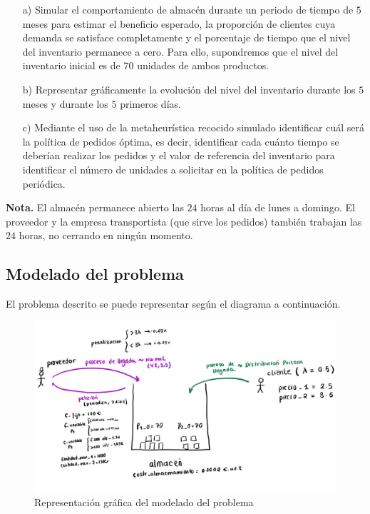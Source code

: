 \documentclass[a4paper,12pt]{article}
\begin{document}
	\begin{enumerate}
		\item[a)] Simular el comportamiento de almacén durante un periodo de tiempo de $5$ meses para estimar el beneficio esperado, la proporción de clientes cuya demanda se satisface completamente y el porcentaje de tiempo que el nivel del inventario permanece a cero. Para ello, supondremos que el nivel del inventario inicial es de $70$ unidades de ambos productos.

		\item[b)] Representar gráficamente la evolución del nivel del inventario durante los $5$ meses y durante los $5$ primeros días. 

		\item[c)] Mediante el uso de la metaheurística recocido simulado identificar cuál será la política de pedidos óptima, es decir, identificar cada cuánto tiempo se deberían realizar los pedidos y el valor de referencia del inventario para identificar el número de unidades a solicitar en la política de pedidos periódica.
	\end{enumerate}
	
	\textbf{Nota.} El almacén permanece abierto las $24$ horas al día de lunes a domingo. El proveedor y la empresa transportista (que sirve los pedidos) también trabajan las $24$ horas, no cerrando en ningún momento.

	\subsection{Modelado del problema}
	El problema descrito se puede representar según el diagrama a continuación.
	
	\begin{figure}[H]
		\centering
		\includegraphics[width=\textwidth]{include/modelo_almacen.png}
		\caption{Representación gráfica del modelado del problema}
	\end{figure}
	
\end{document}
